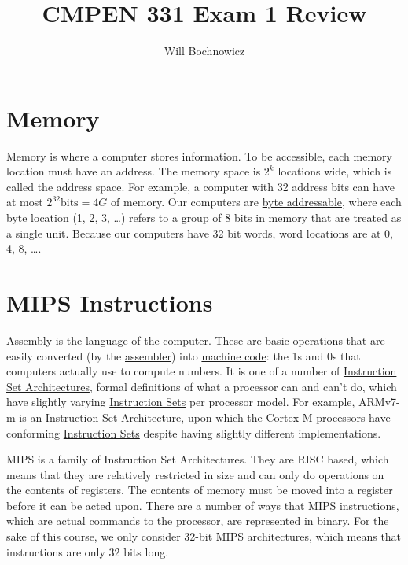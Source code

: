 \documentclass{article}
\title{CMPEN 331 Exam 1 Review}
\author{Will Bochnowicz}
\begin{document}
\maketitle

\tableofcontents

\section{Memory}

Memory is where a computer stores information. To be accessible, each memory location must have an address. The memory space is $2^k$ locations wide, which is called the address space. For example, a computer with 32 address bits can have at most $2^{32} \text{bits} = 4G$ of memory. Our computers are \underline{byte addressable}, where each byte location (1, 2, 3, \ldots) refers to a group of 8 bits in memory that are treated as a single unit. Because our computers have 32 bit words, word locations are at 0, 4, 8, \ldots.

\section{MIPS Instructions}

Assembly is the language of the computer. These are basic operations that are easily converted (by the \underline{assembler}) into \underline{machine code}: the 1s and 0s that computers actually use to compute numbers. It is one of a number of \underline{Instruction Set Architectures}, formal definitions of what a processor can and can't do, which have slightly varying \underline{Instruction Sets} per processor model. For example, ARMv7-m is an \underline{Instruction Set Architecture}, upon which the Cortex-M processors have conforming \underline{Instruction Sets} despite having slightly different implementations. 

MIPS is a family of Instruction Set Architectures. They are RISC based, which means that they are relatively restricted in size and can only do operations on the contents of registers. The contents of memory must be moved into a register before it can be acted upon. There are a number of ways that MIPS instructions, which are actual commands to the processor, are represented in binary. For the sake of this course, we only consider 32-bit MIPS architectures, which means that instructions are only 32 bits long. 
\end{document}
